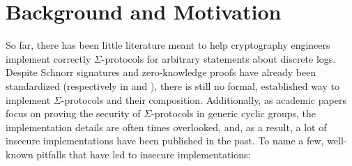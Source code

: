 \documentclass[runningheads]{llncs}
\begin{document}

\section{Background and Motivation}
\label{sec:motivation}
So far, there has been little literature meant to help cryptography engineers implement correctly $\Sigma$-protocols for arbitrary statements about discrete logs.
Despite Schnorr signatures and zero-knowledge proofs have already been standardized (respectively in \cite{rfc8032} and \cite{rfc8235}), there is still no formal, established way to implement  $\Sigma$-protocols and their composition.
 Additionally, as academic papers focus on proving the security of  $\Sigma$-protocols in generic cyclic groups, the implementation details are often times overlooked, and, as a result, a lot of insecure implementations have been published in the past. To name a few, well-known pitfalls that have led to insecure implementations:
\end{document}
